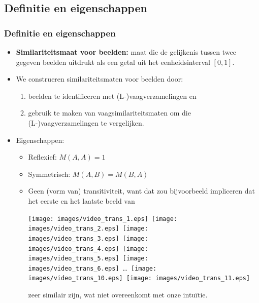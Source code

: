 \documentclass[dutch]{beamer}
\theoremstyle{definition}
\theoremstyle{remark}
\theoremstyle{example}
\begin{document}
\subsection{Definitie en eigenschappen}
\frame
{
  \frametitle{Definitie en eigenschappen}

  \begin{itemize}
  \item \textbf{Similariteitsmaat voor beelden:} maat die de gelijkenis 
  tussen twee gegeven beelden uitdrukt als een getal uit het eenheidsinterval 
  $[0,1]$.
  \item We construeren similariteitsmaten voor beelden door:
  \begin{enumerate}
    \item beelden te identificeren met (L-)vaagverzamelingen en
    \item gebruik te maken van vaagsimilariteitsmaten om die (L-)vaagverzamelingen
    te vergelijken.
  \end{enumerate}
  \item Eigenschappen:
  \begin{itemize}
  \item Reflexief: $M(A,A)=1$
  \item Symmetrisch: $M(A,B)=M(B,A)$
  \item Geen (vorm van) transitiviteit, want dat zou bijvoorbeeld impliceren dat 
  het eerste en het laatste beeld van
  \begin{center}
  \vspace{5pt}
  \texttt{[image: images/video\_trans\_1.eps]}\ 
  \texttt{[image: images/video\_trans\_2.eps]}\ 
  \texttt{[image: images/video\_trans\_3.eps]}\ 
  \texttt{[image: images/video\_trans\_4.eps]}\ 
  \texttt{[image: images/video\_trans\_5.eps]}\
  \texttt{[image: images/video\_trans\_6.eps]}\
  \ldots\ 
  \texttt{[image: images/video\_trans\_10.eps]}\ 
  \texttt{[image: images/video\_trans\_11.eps]}
  \end{center}
  zeer similair zijn, wat niet overeenkomt met onze intu\"itie.
  \end{itemize}
  \end{itemize}
}
\end{document}
